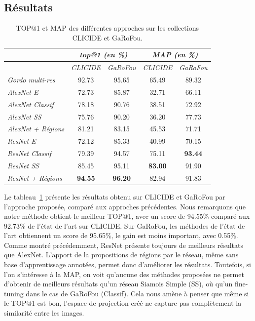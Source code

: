 \subsection{Résultats}
\label{sec:resultatregion}

\begin{table}
\centering
\begin{tabular}{|l||c|c||c|c|}
\hline & \multicolumn{2}{c||}{\emph{top@1 (en \%)}} &
\multicolumn{2}{c|}{\emph{MAP (en \%)}}\\
\hline & \emph{CLICIDE} & \emph{GaRoFou} & \emph{CLICIDE} & \emph{GaRoFou}\\
\hline \emph{Gordo multi-res~\cite{gordo2016deep}}
& 92.73 & 95.65 & 65.49 & 89.32\\ \hhline{|=||=|=||=|=|}
\hline \emph{AlexNet E} & 72.73 & 85.87 & 32.71 & 66.11\\
\hline \emph{AlexNet Classif} & 78.18 & 90.76 & 38.51 & 72.92\\
\hline \emph{AlexNet SS} & 75.76 & 90.20 & 36.20 & 77.73\\
\hline \emph{AlexNet + Régions} & 81.21 & 83.15 & 45.53 & 71.71\\ 
\hhline{|=||=|=||=|=|}
\hline \emph{ResNet E} & 72.12 & 85.33 & 40.99 & 70.15\\
\hline \emph{ResNet Classif} & 79.39 & 94.57 & 75.11 & \textbf{93.44}\\
\hline \emph{ResNet SS} & 85.45 & 95.11 & \textbf{83.00} & 91.90\\
\hline \emph{ResNet + Régions} & \textbf{94.55} & \textbf{96.20}
& 82.94 & 91.83\\
\hline
\end{tabular}
\caption{TOP@1 et MAP des différentes approches sur les collections CLICIDE et GaRoFou.
\label{tab:results}}
\end{table}



Le tableau~\ref{tab:results} présente les résultats obtenu sur CLICIDE et GaRoFou par l'approche proposée, comparé aux approches précédentes.
Nous remarquons que notre méthode obtient le meilleur TOP@1, avec un score de 94.55\% comparé aux 92.73\% de l’état de l’art sur CLICIDE.
Sur GaRoFou, les méthodes de l’état de l’art obtiennent un score de 95.65\%, le gain est moins important, avec 0.55\%.
Comme montré précédemment, ResNet présente toujours de meilleurs résultats que AlexNet.
L'apport de la propositions de régions par le réseau, même sans base d'apprentissage annotées, permet donc d'améliorer les résultats.
Toutefois, si l'on s'intéresse à la MAP, on voit qu'aucune des méthodes proposées ne permet d'obtenir de meilleurs résultats qu'un réseau Siamois Simple (SS), où qu'un fine-tuning dans le cas de GaRoFou (Classif).
Cela nous amène à penser que même si le TOP@1 est bon, l'espace de projection créé ne capture pas complètement la similarité entre les images.




